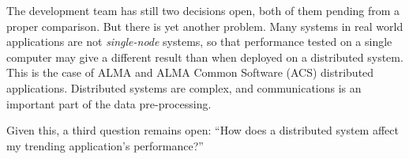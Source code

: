 
The development team has still two decisions open, both of them pending from a
proper comparison. But there is yet another problem.
Many systems in real world applications are not \emph{single-node} systems,
so that performance tested on a single computer may give a different result
than when deployed on a distributed system. This is the case of
ALMA and ALMA Common Software (ACS) distributed applications. Distributed systems are complex, and
communications is an important part of the data pre-processing.


Given this, a third question remains open: ``How does a distributed system
affect my trending application's performance?''



